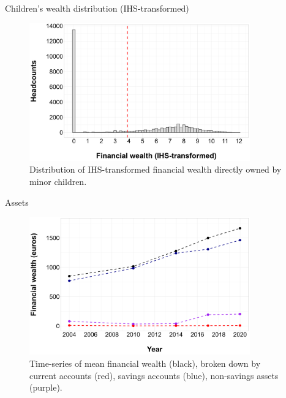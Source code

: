 \documentclass[xolor = dvipsnames, compress]{beamer} %
\begin{document}

\begin{frame}[label = distrib_ihs]{Children's wealth distribution (IHS-transformed)}    
	\begin{figure}[h]
		\centering
		\includegraphics[width = 0.85\textwidth, height = 0.85\textheight, keepaspectratio]{wealthall_distrib_ihs.png}
		\caption{\scriptsize{Distribution of IHS-transformed financial wealth directly owned by minor children.}}
	\end{figure}
\end{frame}


\begin{frame}[label = assets]{Assets}    
	\begin{figure}[h]
		\centering
		\includegraphics[width = 0.85\textwidth, height = 0.85\textheight, keepaspectratio]{wealthall_time_series_assets.png}
		\caption{\scriptsize{Time-series of mean financial wealth (black), broken down by current accounts (red), savings accounts (blue), non-savings assets (purple).}}
	\end{figure}
\end{frame}
\end{document}
